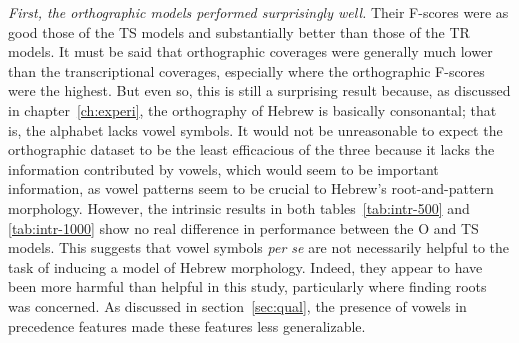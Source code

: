 \emph{First, the orthographic models performed surprisingly well.} 
Their F-scores were as good those of the TS models and substantially better than those of the
  TR models. It must be said that orthographic coverages were generally much lower than the transcriptional coverages, especially where the orthographic F-scores were the highest.
But even so, this is still a surprising result because, as discussed in chapter~\ref{ch:experi}, 
 the orthography of Hebrew is basically consonantal; that is, the alphabet lacks vowel symbols. 
It would not be unreasonable to expect the orthographic dataset to be the least efficacious of the three because it
lacks the information contributed by vowels, which would seem to be important information, as vowel patterns seem to be crucial to Hebrew's 
root-and-pattern morphology. However, the intrinsic results in both tables~\ref{tab:intr-500} and \ref{tab:intr-1000} 
show no real difference in performance between the O and TS models.
This suggests that vowel symbols \emph{per se} are not necessarily 
helpful to the task of inducing a model of Hebrew morphology. Indeed, 
they appear to have been more harmful than helpful in this study,
particularly where finding roots was concerned. As discussed in section~\ref{sec:qual}, the presence of vowels in precedence features made these features less generalizable. 

